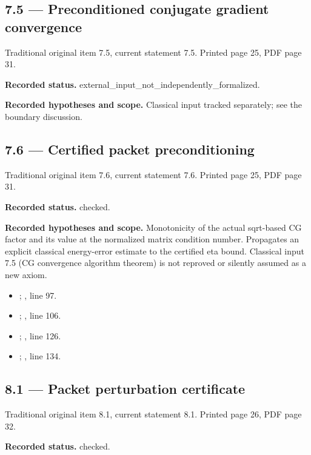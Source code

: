 \subsection{7.5 — Preconditioned conjugate gradient convergence}
\label{result:7.5}
{\footnotesize\color{muted}Traditional original item 7.5, current statement 7.5. Printed page 25, PDF page 31.}\par
\textbf{Recorded status.} external\_input\_not\_independently\_formalized.

\textbf{Recorded hypotheses and scope.} Classical input tracked separately; see the boundary discussion.

\subsection{7.6 — Certified packet preconditioning}
\label{result:7.6}
{\footnotesize\color{muted}Traditional original item 7.6, current statement 7.6. Printed page 25, PDF page 31.}\par
\textbf{Recorded status.} checked.

\textbf{Recorded hypotheses and scope.} Monotonicity of the actual sqrt-based CG factor and its value at the normalized matrix condition number. Propagates an explicit classical energy-error estimate to the certified eta bound. Classical input 7.5 (CG convergence algorithm theorem) is not reproved or silently assumed as a new axiom.

\begin{itemize}
\item {}; , line 97.
\item {}; , line 106.
\item {}; , line 126.
\item {}; , line 134.
\end{itemize}
\subsection{8.1 — Packet perturbation certificate}
\label{result:8.1}
{\footnotesize\color{muted}Traditional original item 8.1, current statement 8.1. Printed page 26, PDF page 32.}\par
\textbf{Recorded status.} checked.


